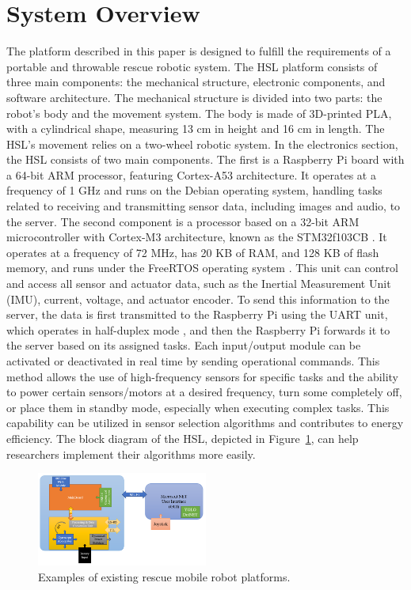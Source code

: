 \documentclass[conference]{IEEEtran}
\begin{document}
\section{System Overview}
The platform described in this paper is designed to fulfill the requirements of a portable and throwable rescue robotic system. The HSL platform consists of three main components: the mechanical structure, electronic components, and software architecture. The mechanical structure is divided into two parts: the robot's body and the movement system. The body is made of 3D-printed PLA, with a cylindrical shape, measuring 13 cm in height and 16 cm in length. The HSL's movement relies on a two-wheel robotic system. In the electronics section, the HSL consists of two main components. The first is a Raspberry Pi board with a 64-bit ARM processor, featuring Cortex-A53 architecture. It operates at a frequency of 1 GHz and runs on the Debian operating system, handling tasks related to receiving and transmitting sensor data, including images and audio, to the server. The second component is a processor based on a 32-bit ARM microcontroller with Cortex-M3 architecture, known as the STM32f103CB \cite{CarmineNoviello2022}. It operates at a frequency of 72 MHz, has 20 KB of RAM, and 128 KB of flash memory, and runs under the FreeRTOS operating system \cite{GUAN201619}. This unit can control and access all sensor and actuator data, such as the Inertial Measurement Unit (IMU), current, voltage, and actuator encoder. To send this information to the server, the data is first transmitted to the Raspberry Pi using the UART unit, which operates in half-duplex mode \cite{teimouri2018mrl}, and then the Raspberry Pi forwards it to the server based on its assigned tasks. Each input/output module can be activated or deactivated in real time by sending operational commands. This method allows the use of high-frequency sensors for specific tasks and the ability to power certain sensors/motors at a desired frequency, turn some completely off, or place them in standby mode, especially when executing complex tasks. This capability can be utilized in sensor selection algorithms and contributes to energy efficiency. The block diagram of the HSL, depicted in Figure~\ref{Fig_BlockDiagram}, can help researchers implement their algorithms more easily.

\begin{figure}[htbp] 
    \centerline{\includegraphics[width=0.5\textwidth]{BlockDiagram.PNG}} 
    \caption{Examples of existing rescue mobile robot platforms.} 
    \label{Fig_BlockDiagram}
\end{figure}
\end{document}
